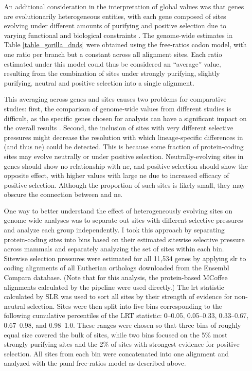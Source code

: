 An additional consideration in the interpretation of global \dnds
values was that genes are evolutionarily heterogeneous entities, with
each gene composed of sites evolving under different amounts of
purifying and positive selection due to varying functional and
biological constraints \citep{Whelan2008}. The genome-wide \dnds
estimates in Table \ref{table_gorilla_dnds} were obtained using the
free-ratios codon model, with one \dnds ratio per branch but a
constant \dnds across all alignment sites. Each \dnds ratio estimated
under this model could thus be considered an ``average'' value,
resulting from the combination of sites under strongly purifying,
slightly purifying, neutral and positive selection into a single
alignment. 

This averaging across genes and sites causes two problems for
comparative studies: first, the comparison of genome-wide \dnds values
from different studies is difficult, as the specific genes chosen for
analysis can have a significant impact on the overall results
\citep{Ellegren2008}. Second, the inclusion of sites with very
different selective pressures might decrease the resolution with which
lineage-specific differences in \dnds (and thus \ac{ne}) could be
detected. This is because some fraction of protein-coding sites may
evolve neutrally or under positive selection. Neutrally-evolving sites
in genes should show no relationship with \ac{ne}, and positive
selection should show the opposite effect, with higher \dnds values
with large \ac{ne} due to increased efficacy of positive
selection. Although the proportion of such sites is likely small, they
may obscure the connection between \dnds and \ac{ne}.

One way to better understand the effect of heterogeneously evolving
sites on genome-wide \dnds analyses was to separate out sites with
different selective pressures and analyze each group independently. I
took this approach by separating protein-coding sites into bins based
on their estimated sitewise selective pressure across mammals and
separately analyzing the set of sites within each bin. Sitewise
selection pressures were estimated for all 11,534 genes by applying
\ac{slr} \citep{Massingham2005} to coding alignments of all Eutherian
orthologs downloaded from the Ensembl Compara database. (Note that for
this analysis, the protein-based MCoffee alignments calculated by the
\ens pipeline were used directly.) The \sw \ac{lrt} statistic
calculated by SLR was used to sort all sites by their strength of
evidence for non-neutral selection. Sites were then split into five
bins corresponding to the following cumulative percentiles of the LRT
statistic: 0--0.05, 0.05--0.33, 0.33--0.67, 0.67--0.98, and
0.98--1.0. These ranges were chosen so that three bins of roughly
equal size covered the bulk of sites, while two bins focused on the
5\% most strongly purifying sites and the 2\% of sites with strongest
evidence for positive selection. All sites from each bin were
concatenated into one alignment and analyzed with the \ac{paml}
free-ratios model as described above.

